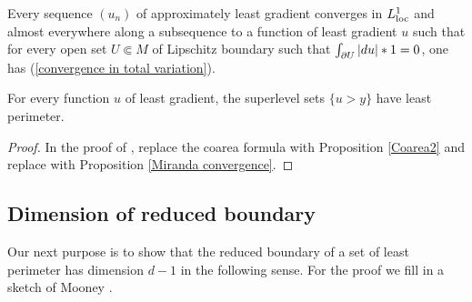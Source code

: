 \begin{corollary}\label{compactness}
Every sequence $(u_n)$ of approximately least gradient converges in $L^1_{\mathrm{loc}}$ and almost everywhere along a subsequence to a function of least gradient $u$ such that for every open set $U \Subset M$ of Lipschitz boundary such that $\int_{\partial U} |du|*1 = 0$, one has (\ref{convergence in total variation}).
\end{corollary}

\begin{proposition}\label{level sets are minimal}
For every function $u$ of least gradient, the superlevel sets $\{u > y\}$ have least perimeter.
\end{proposition}
\begin{proof}
In the proof of \cite[Theorem 1]{BOMBIERI1969}, replace the coarea formula \cite[Theorem 1.6]{Miranda66} with Proposition \ref{Coarea2} and replace \cite[Teorema 3]{Miranda67} with Proposition \ref{Miranda convergence}.
\end{proof}


\subsection{Dimension of reduced boundary}
Our next purpose is to show that the reduced boundary of a set of least perimeter has dimension $d - 1$ in the following sense.
For the proof we fill in a sketch of Mooney \cite[Theorem 12]{Mooney11}.

